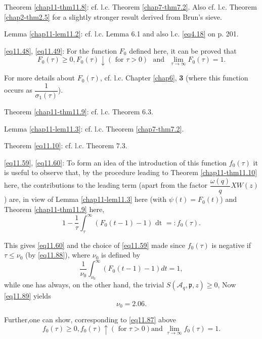 Theorem \ref{chap11-thm11.8}: cf. l.c. Theorem
\ref{chap7-thm7.2}. Also cf. l.c. Theorem \ref{chap2-thm2.5} for a
slightly stronger result derived from Brun's sieve.  
 
Lemma \ref{chap11-lem11.2}: cf. l.c. Lemma 6.1 and also
l.c.  \eqref{eq4.18}  on p. 201. 


\eqref{eq11.48}, \eqref{eq11.49}: For the function $F_0$  defined
here, it can be proved that   
\begin{equation*}
F_0 (\tau) \ge 0, F_0 (\tau ) \downarrow (\text{ for } \tau >0 )
\text{~ and~  } \lim\limits_{\tau \to \infty} F_0 (\tau )
=1. \tag{11.87}\label{eq11.87} 
\end{equation*}

For more details about $F_0 (\tau )$, cf. l.c. Chapter
\ref{chap6}, \textbf{3} (where this function occurs as $\dfrac{1}{\sigma_1
  (\tau)}$).  

Theorem \ref{chap11-thm11.9}: cf. l.c. Theorem 6.3.

Lemma \ref{chap11-lem11.3}: cf. l.c. Theorem \ref{chap7-thm7.2}.

Theorem \eqref{eq11.10}: cf. l.c. Theorem 7.3.

\eqref{eq11.59}, \eqref{eq11.60}: To  form an idea of the introduction
of this function $f_0 (\tau)$ it is useful  to  observe that, by the
procedure leading to Theorem \ref{chap11-thm11.10} here, the
contributions  to the 
leading term (apart from the factor $\dfrac{\omega(q)}{q}X W (z)$)
are, in view of Lemma \ref{chap11-lem11.3} here (with $\psi (t)=F_0 (t)$) and
Theorem \ref{chap11-thm11.9} here, 
\begin{equation*}
1-\frac{1}{\tau} \int^{\infty}_{\tau} (F_0 (t-1) -1)  \text { dt } = :
f_0 (\tau ). \tag{11.88}\label{eq11.88} 
\end{equation*}

This gives \eqref{eq11.60} and the choice of \eqref{eq11.59} made
since $f_0 (\tau)$ is negative if $\tau \leq \nu _0$ (by
\eqref{eq11.88}), where $\nu _0$ is defined by  
\begin{equation*}
\frac{1}{\nu _0}\int^{\infty}_{\nu_{0}} (F_0 (t-1)-1)  dt= 1,
\tag{11.89}\label{eq11.89} 
\end{equation*}
while one has always, on the other hand, the trivial $S
(\mathscr{A}_q, \mathfrak{p},z) \ge 0$,  Now \eqref{eq11.89} yields   
$$
\nu_0 = 2.06.
$$

Further,\pageoriginale one can show, corresponding to \eqref{eq11.87} above
\begin{equation*}
f_0(\tau ) \ge 0, f_0 (\tau) \uparrow ( \text { for } \tau > 0) \text{
  and } \lim\limits_{ \tau \to \infty} f_0(\tau ) =
1. \tag{11.90}\label{eq11.90}  
\end{equation*}

